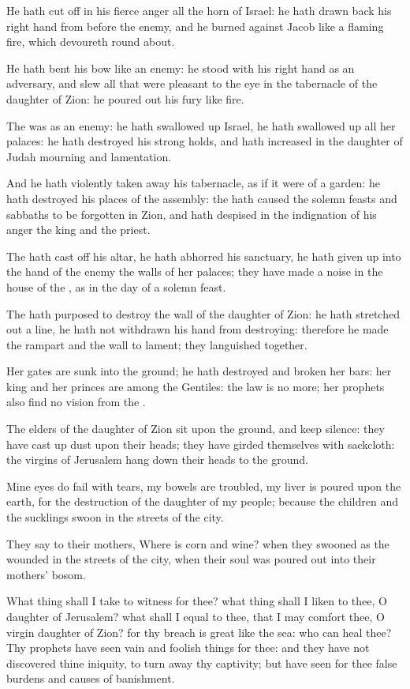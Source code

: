 \Verse He hath cut off in his fierce anger all the horn of Israel: he hath drawn back his right hand from before the enemy, and he burned against Jacob like a flaming fire, which devoureth round about.

\Verse He hath bent his bow like an enemy: he stood with his right hand as an adversary, and slew all that were pleasant to the eye in the tabernacle of the daughter of Zion: he poured out his fury like fire.

\Verse The \LORD was as an enemy: he hath swallowed up Israel, he hath swallowed up all her palaces: he hath destroyed his strong holds, and hath increased in the daughter of Judah mourning and lamentation.

\Verse And he hath violently taken away his tabernacle, as if it were of a garden: he hath destroyed his places of the assembly: the \LORD hath caused the solemn feasts and sabbaths to be forgotten in Zion, and hath despised in the indignation of his anger the king and the priest.

\Verse The \LORD hath cast off his altar, he hath abhorred his sanctuary, he hath given up into the hand of the enemy the walls of her palaces; they have made a noise in the house of the \LORD, as in the day of a solemn feast.

\Verse The \LORD hath purposed to destroy the wall of the daughter of Zion: he hath stretched out a line, he hath not withdrawn his hand from destroying: therefore he made the rampart and the wall to lament; they languished together.

\Verse Her gates are sunk into the ground; he hath destroyed and broken her bars: her king and her princes are among the Gentiles: the law is no more; her prophets also find no vision from the \LORD.

\Verse The elders of the daughter of Zion sit upon the ground, and keep silence: they have cast up dust upon their heads; they have girded themselves with sackcloth: the virgins of Jerusalem hang down their heads to the ground.

\Verse Mine eyes do fail with tears, my bowels are troubled, my liver is poured upon the earth, for the destruction of the daughter of my people; because the children and the sucklings swoon in the streets of the city.

\Verse They say to their mothers, Where is corn and wine? when they swooned as the wounded in the streets of the city, when their soul was poured out into their mothers' bosom.

\Verse What thing shall I take to witness for thee? what thing shall I liken to thee, O daughter of Jerusalem? what shall I equal to thee, that I may comfort thee, O virgin daughter of Zion? for thy breach is great like the sea: who can heal thee?  \Verse Thy prophets have seen vain and foolish things for thee: and they have not discovered thine iniquity, to turn away thy captivity; but have seen for thee false burdens and causes of banishment.

